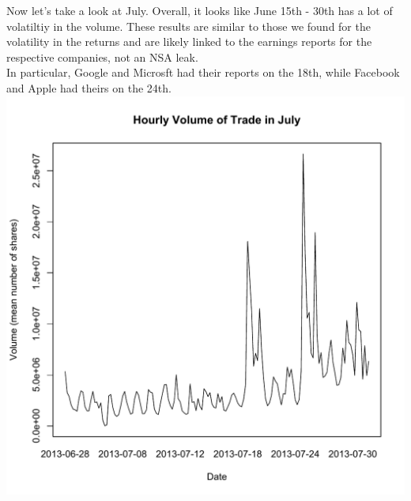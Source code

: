 \documentclass[11pt]{amsart}
\begin{document}
\newpage

Now let's take a look at July. Overall, it looks like June 15th - 30th has a lot of volatiltiy in the volume. These results are similar to those we found for the volatility in the returns and are likely linked to the earnings reports for the respective companies, not an NSA leak. \\

In particular, Google and Microsft had their reports on the 18th, while Facebook and Apple had theirs on the 24th. \\

\includegraphics[scale = 0.5]{july_volume.pdf} \\
\end{document}

